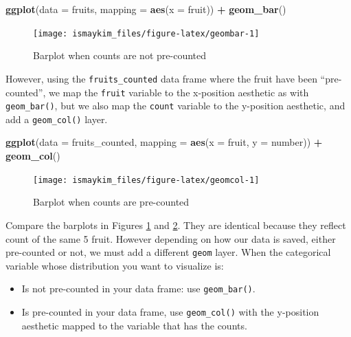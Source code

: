\documentclass[12pt, krantz2,]{krantz}
\makeatletter
\newenvironment{Shaded}{\begin{snugshade}}{\end{snugshade}}
\newcommand{\DataTypeTok}[1]{\textcolor[rgb]{0.27,0.27,0.27}{#1}}
\newcommand{\KeywordTok}[1]{\textcolor[rgb]{0.27,0.27,0.27}{\textbf{#1}}}
\newcommand{\NormalTok}[1]{#1}
\newcommand{\OperatorTok}[1]{\textcolor[rgb]{0.43,0.43,0.43}{\textbf{#1}}}
\newcommand{\StringTok}[1]{\textcolor[rgb]{0.5,0.5,0.5}{#1}}
\providecommand{\tightlist}{%
  \setlength{\itemsep}{0pt}\setlength{\parskip}{0pt}}
\newenvironment{kframe}{%
\medskip{}
\setlength{\fboxsep}{.8em}
 \def\at@end@of@kframe{}%
 \ifinner\ifhmode%
  \def\at@end@of@kframe{\end{minipage}}%
  \begin{minipage}{\columnwidth}%
 \fi\fi%
 \def\FrameCommand##1{\hskip\@totalleftmargin \hskip-\fboxsep
 \colorbox{shadecolor}{##1}\hskip-\fboxsep
     \hskip-\linewidth \hskip-\@totalleftmargin \hskip\columnwidth}%
 \MakeFramed {\advance\hsize-\width
   \@totalleftmargin\z@ \linewidth\hsize
   \@setminipage}}%
 {\par\unskip\endMakeFramed%
 \at@end@of@kframe}
\renewenvironment{Shaded}{\begin{kframe}}{\end{kframe}}
\makeatother
\begin{document}
\begin{Shaded}
\begin{Highlighting}[]
\KeywordTok{ggplot}\NormalTok{(}\DataTypeTok{data =}\NormalTok{ fruits, }\DataTypeTok{mapping =} \KeywordTok{aes}\NormalTok{(}\DataTypeTok{x =}\NormalTok{ fruit)) }\OperatorTok{+}
\StringTok{  }\KeywordTok{geom_bar}\NormalTok{()}
\end{Highlighting}
\end{Shaded}

\begin{figure}

{\centering \texttt{[image: ismaykim\_files/figure-latex/geombar-1]} 

}

\caption{Barplot when counts are not pre-counted}\label{fig:geombar}
\end{figure}

However, using the \texttt{fruits\_counted} data frame where the fruit have been ``pre-counted'', we map the \texttt{fruit} variable to the x-position aesthetic as with \texttt{geom\_bar()}, but we also map the \texttt{count} variable to the y-position aesthetic, and add a \texttt{geom\_col()} layer.

\begin{Shaded}
\begin{Highlighting}[]
\KeywordTok{ggplot}\NormalTok{(}\DataTypeTok{data =}\NormalTok{ fruits_counted, }\DataTypeTok{mapping =} \KeywordTok{aes}\NormalTok{(}\DataTypeTok{x =}\NormalTok{ fruit, }\DataTypeTok{y =}\NormalTok{ number)) }\OperatorTok{+}
\StringTok{  }\KeywordTok{geom_col}\NormalTok{()}
\end{Highlighting}
\end{Shaded}

\begin{figure}

{\centering \texttt{[image: ismaykim\_files/figure-latex/geomcol-1]} 

}

\caption{Barplot when counts are pre-counted}\label{fig:geomcol}
\end{figure}

Compare the barplots in Figures \ref{fig:geombar} and \ref{fig:geomcol}. They are identical because they reflect count of the same 5 fruit. However depending on how our data is saved, either pre-counted or not, we must add a different \texttt{geom} layer. When the categorical variable whose distribution you want to visualize is:

\begin{itemize}
\tightlist
\item
  Is not pre-counted in your data frame: use \texttt{geom\_bar()}.
\item
  Is pre-counted in your data frame, use \texttt{geom\_col()} with the y-position aesthetic mapped to the variable that has the counts.
\end{itemize}
\end{document}
